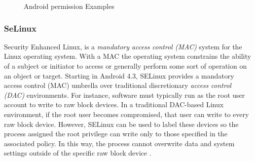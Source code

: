 	\begin{figure}[h]
		\centering
		\begin{minipage}{.49\textwidth}\centering
		\end{minipage}
		\begin{minipage}{.49\textwidth}\centering
		\end{minipage}
		\caption{Android permission Examples\label{fig:2.5}}
	\end{figure}

	\subsubsection{SeLinux} Security Enhanced Linux, is a \textit{mandatory access control (MAC)} system for the Linux operating system. With a MAC the operating system constrains the ability of a subject or initiator to access or generally perform some sort of operation on an object or target. Starting in Android 4.3, SELinux provides a mandatory access control (MAC) umbrella over traditional discretionary \textit{access control (DAC)} environments. For instance, software must typically run as the root user account to write to raw block devices. In a traditional DAC-based Linux environment, if the root user becomes compromised, that user can write to every raw block device. However, SELinux can be used to label these devices so the process assigned the root privilege can write only to those specified in the associated policy.
 	In this way, the process cannot overwrite data and system settings outside of the specific raw block device \cite{secure2017android}.

